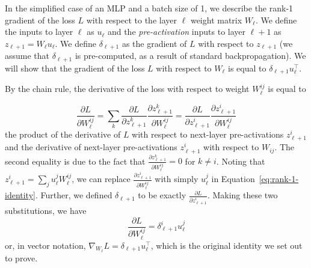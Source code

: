 \section{}
\label{sec:rank-1-gradient}
In the simplified case of an MLP and a batch size of 1, we describe the rank-1 gradient of the loss $L$ with respect to the layer $\ell$ weight matrix $W_\ell$. We define the inputs to layer $\ell$ as $u_\ell$ and the \textit{pre-activation} inputs to layer $\ell + 1$ as $z_{\ell+1}=W_\ell u_\ell$. We define $\delta_{\ell+1}$ as the gradient of $L$ with respect to $z_{\ell+1}$ (we assume that $\delta_{\ell+1}$ is pre-computed, as a result of standard backpropagation). We will show that the gradient of the loss $L$ with respect to $W_\ell$ is equal to $\delta_{\ell+1}u_\ell^\top$.

By the chain rule, the derivative of the loss with respect to weight $W_\ell^{ij}$ is equal to

\begin{equation}
    \label{eq:rank-1-identity}
    \frac{\partial L}{\partial W_\ell^{ij}} = \sum_k\frac{\partial L}{\partial z_{\ell+1}^k}\frac{\partial z_{\ell+1}^k}{\partial W_\ell^{ij}} = \frac{\partial L}{\partial z_{\ell+1}^i}\frac{\partial z_{\ell+1}^i}{\partial W_\ell^{ij}}
\end{equation}
the product of the derivative of $L$ with respect to next-layer pre-activations $z_{\ell+1}^i$ and the derivative of next-layer pre-activations $z_{\ell+1}^i$ with respect to $W_{ij}$. The second equality is due to the fact that $\frac{\partial z_{\ell+1}^k}{\partial W_\ell^{ij}} = 0$ for $k \neq i$. Noting that $z_{\ell+1}^i = \sum_j u_\ell^j W_\ell^{ij}$, we can replace $\frac{\partial z_{\ell+1}^i}{\partial W_\ell^{ij}}$ with simply $u_\ell^j$ in Equation~\ref{eq:rank-1-identity}. Further, we defined $\delta_{\ell+1}$ to be exactly $\frac{\partial L}{\partial z_{\ell+1}^i}$. Making these two substitutions, we have
\begin{equation}
    \frac{\partial L}{\partial W_\ell^{ij}} = \delta_{\ell+1}^i u_\ell^j
\end{equation}
or, in vector notation, $\nabla_{W_\ell}L = \delta_{\ell+1}u_\ell^\top$, which is the original identity we set out to prove.

\section{}
\label{sec:attention-editing}

